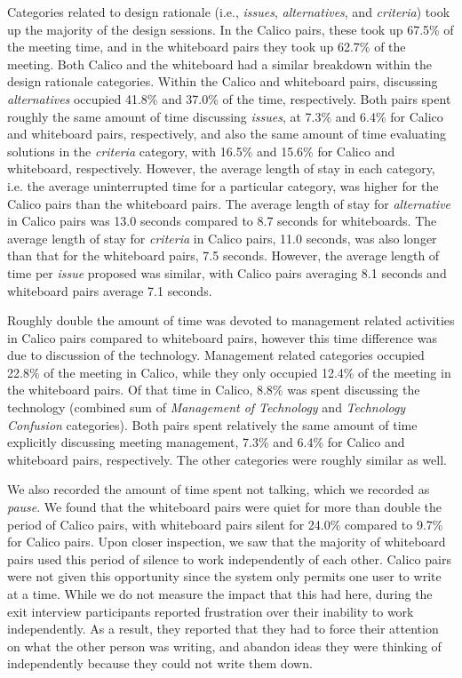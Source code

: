 Categories related to design rationale (i.e., \emph{issues}, \emph{alternatives}, and \emph{criteria}) took up the majority of the design sessions. In the Calico pairs, these took up 67.5\% of the meeting time, and in the whiteboard pairs they took up 62.7\% of the meeting. Both Calico and the whiteboard had a similar breakdown within the design rationale categories. Within the Calico and whiteboard pairs, discussing \emph{alternatives} occupied 41.8\% and 37.0\% of the time, respectively. Both pairs spent roughly the same amount of time discussing \emph{issues}, at 7.3\% and 6.4\% for Calico and whiteboard pairs, respectively, and also the same amount of time evaluating solutions in the \emph{criteria} category, with 16.5\% and 15.6\% for Calico and whiteboard, respectively. However, the average length of stay in each category, i.e. the average uninterrupted time for a particular category, was higher for the Calico pairs than the whiteboard pairs. The average length of stay for \emph{alternative} in Calico pairs was 13.0 seconds compared to 8.7 seconds for whiteboards. The average length of stay for \emph{criteria} in Calico pairs, 11.0 seconds, was also longer than that for the whiteboard pairs, 7.5 seconds. However, the average length of time per \emph{issue} proposed was similar, with Calico pairs averaging 8.1 seconds and whiteboard pairs average 7.1 seconds.

Roughly double the amount of time was devoted to management related activities in Calico pairs compared to whiteboard pairs, however this time difference was due to discussion of the technology. Management related categories occupied 22.8\% of the meeting in Calico, while they only occupied 12.4\% of the meeting in the whiteboard pairs. Of that time in Calico, 8.8\% was spent discussing the technology (combined sum of \emph{Management of Technology} and \emph{Technology Confusion} categories). Both pairs spent relatively the same amount of time explicitly discussing meeting management, 7.3\% and 6.4\% for Calico and whiteboard pairs, respectively. The other categories were roughly similar as well.

We also recorded the amount of time spent not talking, which we recorded as \emph{pause}. We found that the whiteboard pairs were quiet for more than double the period of Calico pairs, with whiteboard pairs silent for 24.0\% compared to 9.7\% for Calico pairs. Upon closer inspection, we saw that the majority of whiteboard pairs used this period of silence to work independently of each other. Calico pairs were not given this opportunity since the system only permits one user to write at a time. While we do not measure the impact that this had here, during the exit interview participants reported frustration over their inability to work independently. As a result, they reported that they had to force their attention on what the other person was writing, and abandon ideas they were thinking of independently because they could not write them down.

